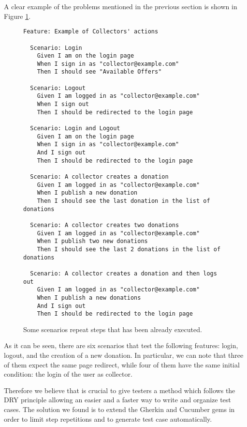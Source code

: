 A clear example of the problems mentioned in the previous section is shown in Figure \ref{figure:scenario_example_problems}.

\begin{figure}[H]
\begin{verbatim}
Feature: Example of Collectors' actions

  Scenario: Login
    Given I am on the login page
    When I sign in as "collector@example.com"
    Then I should see "Available Offers"

  Scenario: Logout
    Given I am logged in as "collector@example.com"
    When I sign out
    Then I should be redirected to the login page

  Scenario: Login and Logout
    Given I am on the login page
    When I sign in as "collector@example.com"
    And I sign out
    Then I should be redirected to the login page

  Scenario: A collector creates a donation
    Given I am logged in as "collector@example.com"
    When I publish a new donation
    Then I should see the last donation in the list of donations

  Scenario: A collector creates two donations
    Given I am logged in as "collector@example.com"
    When I publish two new donations
    Then I should see the last 2 donations in the list of donations

  Scenario: A collector creates a donation and then logs out
    Given I am logged in as "collector@example.com"
    When I publish a new donations
    And I sign out
    Then I should be redirected to the login page
\end{verbatim}
\vspace{-1em}
\caption{Some scenarios repeat steps that has been already executed.}
\label{figure:scenario_example_problems}
\end{figure}

As it can be seen, there are six scenarios that test the following features: login, logout, and the creation of a new donation. In particular, we can note that three of them expect the same page redirect, while four of them have the same initial condition: the login of the user as collector.

Therefore we believe that is crucial to give testers a method which follows the DRY principle allowing an easier and a faster way to write and organize test cases. The solution we found is to extend the Gherkin and Cucumber gems in order to limit step repetitions and to generate test case automatically.

